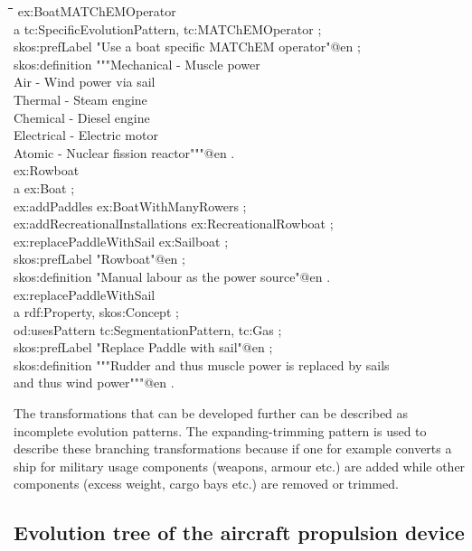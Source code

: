 \documentclass[11pt,a4paper]{article}
\newenvironment{code}{\tt \begin{tabbing}
\hskip12pt\=\hskip12pt\=\hskip12pt\=\hskip12pt\=\hskip5cm\=\hskip5cm\=\kill}
{\end{tabbing}}
\begin{document}
\begin{code}
ex:BoatMATChEMOperator\\
\> a tc:SpecificEvolutionPattern, tc:MATChEMOperator ;\\
\> skos:prefLabel "Use a boat specific MATChEM operator"@en ;\\
\> skos:definition """Mechanical - Muscle power\\
\> Air - Wind power via sail\\
\> Thermal - Steam engine\\
\> Chemical - Diesel engine\\
\> Electrical - Electric motor\\
\> Atomic - Nuclear fission reactor"""@en .\\[4pt]
ex:Rowboat \\
\> a ex:Boat ; \\ 
\> ex:addPaddles ex:BoatWithManyRowers ; \\
\> ex:addRecreationalInstallations ex:RecreationalRowboat ; \\
\> ex:replacePaddleWithSail ex:Sailboat ; \\
\> skos:prefLabel "Rowboat"@en ; \\
\> skos:definition "Manual labour as the power source"@en . \\[4pt]
ex:replacePaddleWithSail \\
\> a rdf:Property, skos:Concept ; \\
\> od:usesPattern tc:SegmentationPattern, tc:Gas ; \\
\> skos:prefLabel "Replace Paddle with sail"@en ; \\
\> skos:definition """Rudder and thus muscle power is replaced by sails \\
\>\> and thus wind power"""@en .
    
\end{code}

The transformations that can be developed further can be described as
incomplete evolution patterns. The expanding-trimming pattern is used to
describe these branching transformations because if one for example converts a
ship for military usage components (weapons, armour etc.) are added while
other components (excess weight, cargo bays etc.) are removed or trimmed.

\subsection{Evolution tree of the aircraft propulsion device}
\end{document}
